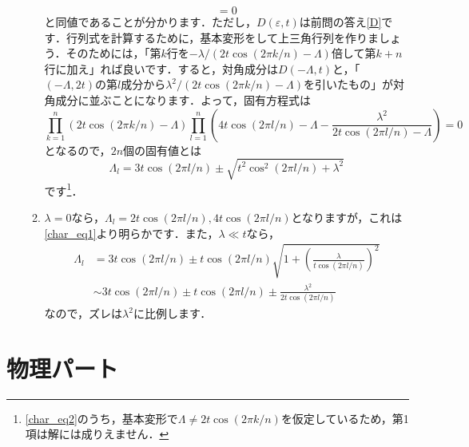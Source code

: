 \documentclass[a4paper,pdflatex,ja=standard]{bxjsarticle}
\begin{document}
\begin{enumerate}
\begin{enumerate}
\begin{equation}
      =
      0
      \label{char_eq1}
    \end{equation}
    と同値であることが分かります．ただし，$D(\varepsilon,t)$は前問の答え\eqref{D}です．行列式を計算するために，基本変形をして上三角行列を作りましょう．そのためには，「第$k$行を$-\lambda/(2t\cos(2\pi k/n)-\Lambda)$倍して第$k+n$行に加え」れば良いです．すると，対角成分は$D(-\Lambda,t)$と，「$(-\Lambda,2t)$の第$l$成分から$\lambda^2/(2t\cos(2\pi k/n)-\Lambda)$を引いたもの」が対角成分に並ぶことになります．よって，固有方程式は
    \begin{equation}
      \prod_{k=1}^{n}
      \left(  
        2t\cos(2\pi k/n)-\Lambda
      \right)
      \prod_{l=1}^{n}
      \left(  
        4t\cos(2\pi l/n)
        -
        \Lambda
        -
        \frac{\lambda^2}{2t\cos(2\pi l/n)-\Lambda}
      \right)
      =
      0
      \label{char_eq2}
    \end{equation}
    となるので，$2n$個の固有値とは
    \begin{equation}
      \Lambda_l
      =
      3t\cos(2\pi l/n)
      \pm
      \sqrt{t^2\cos^2(2\pi l/n)+\lambda^2}
    \end{equation}
    です\footnote{
      \eqref{char_eq2}のうち，基本変形で$\Lambda\neq 2t\cos(2\pi k/n)$を仮定しているため，第1項は解には成りえません．
    }．


    \item 

    $\lambda=0$なら，$\Lambda_l=2t\cos(2\pi l/n),4t\cos(2\pi l/n)$となりますが，これは\eqref{char_eq1}より明らかです．また，$\lambda\ll t$なら，
    \begin{align}
      \Lambda_l
      &=
      3t\cos(2\pi l/n)
      \pm
      t\cos(2\pi l/n)
      \sqrt{
        1+\left( \frac{\lambda}{t\cos(2\pi l/n)} \right)^2
      }
      \nonumber
      \\
      &\sim      
      3t\cos(2\pi l/n)
      \pm
      t\cos(2\pi l/n)
      \pm
      \frac{\lambda^2}{2t\cos(2\pi l/n)}
    \end{align}
    なので，ズレは$\lambda^2$に比例します．

  \end{enumerate}


\end{enumerate}



\clearpage

\section{物理パート}
\end{document}
